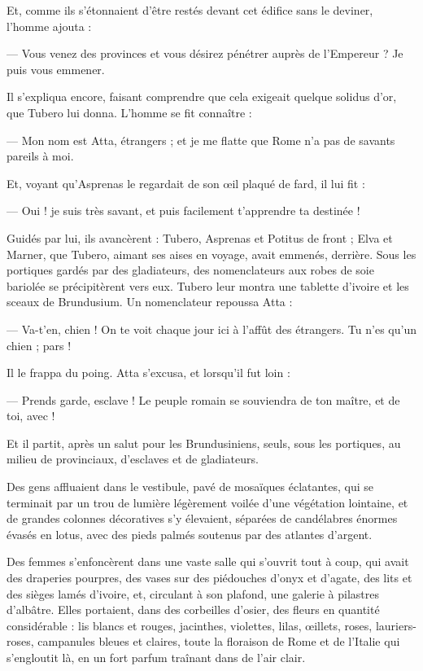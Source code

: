 \documentclass[a4paper, 11pt, oneside, polutonikogreek, french]{article}
\begin{document}
Et, comme ils s'étonnaient d'être restés devant cet édifice sans le deviner, l'homme ajouta :

--- Vous venez des provinces et vous désirez pénétrer auprès de l’Empereur ? Je puis vous emmener.

Il s'expliqua encore, faisant comprendre que cela exigeait quelque solidus d'or, que Tubero lui donna. L'homme se fit connaître :

--- Mon nom est Atta, étrangers ; et je me flatte que Rome n'a pas de savants pareils à moi.

Et, voyant qu'Asprenas le regardait de son œil plaqué de fard, il lui fit :

--- Oui ! je suis très savant, et puis facilement t'apprendre ta destinée !

Guidés par lui, ils avancèrent : Tubero, Asprenas et Potitus de front ; Elva et Marner, que Tubero, aimant ses aises en voyage, avait emmenés, derrière. Sous les portiques gardés par des gladiateurs, des nomenclateurs aux robes de soie bariolée se précipitèrent vers eux. Tubero leur montra une tablette d'ivoire et les sceaux de Brundusium. Un nomenclateur repoussa Atta :

--- Va-t'en, chien ! On te voit chaque jour ici à l'affût des étrangers. Tu n'es qu'un chien ; pars !

Il le frappa du poing. Atta s'excusa, et lorsqu'il fut loin :

--- Prends garde, esclave ! Le peuple romain se souviendra de ton maître, et de toi, avec !

Et il partit, après un salut pour les Brundusiniens, seuls, sous les portiques, au milieu de provinciaux, d'esclaves et de gladiateurs.

Des gens affluaient dans le vestibule, pavé de mosaïques éclatantes, qui se terminait par un trou de lumière légèrement voilée d'une végétation lointaine, et de grandes colonnes décoratives s'y élevaient, séparées de candélabres énormes évasés en lotus, avec des pieds palmés soutenus par des atlantes d'argent.

Des femmes s'enfoncèrent dans une vaste salle qui s'ouvrit tout à coup, qui avait des draperies pourpres, des vases sur des piédouches d'onyx et d'agate, des lits et des sièges lamés d'ivoire, et, circulant à son plafond, une galerie à pilastres d'albâtre. Elles portaient, dans des corbeilles d'osier, des fleurs en quantité considérable : lis blancs et rouges, jacinthes, violettes, lilas, œillets, roses, lauriers-roses, campanules bleues et claires, toute la floraison de Rome et de l'Italie qui s'engloutit là, en un fort parfum traînant dans de l'air clair.
\end{document}
